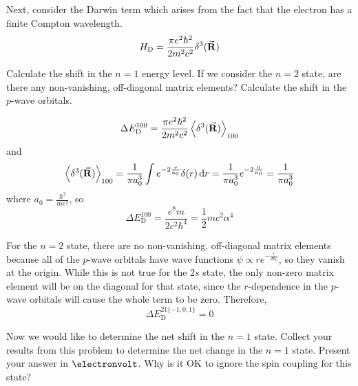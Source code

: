 \documentclass[a4paper,twoside]{article}
\begin{document}
Next, consider the Darwin term which arises from the fact that the electron has a finite Compton wavelength.
\begin{equation}
    H_{\text{D}} = \frac{\pi e^2 \hbar^2}{2m^2 c^2} \delta^3(\va{R})
\end{equation}

Calculate the shift in the $ n = 1 $ energy level. If we consider the $ n = 2 $ state, are there any non-vanishing, off-diagonal matrix elements? Calculate the shift in the $ p $-wave orbitals.

\begin{problem}
    \begin{equation}
        \Delta E_{\text{D}}^{100} = \frac{\pi e^2 \hbar^2}{2m^2 c^2} \ev{\delta^3(\va{R})}_{100}
    \end{equation}
    and
    \begin{equation}
        \ev{\delta^3(\va{R})}_{100} = \frac{1}{\pi a_0^3} \int e^{-2 \frac{r}{a_0}} \delta(r) \dd{r} = \frac{1}{\pi a_0^3} e^{-2 \frac{0}{a_0}} = \frac{1}{\pi a_0^3}
    \end{equation}
    where $ a_0 = \frac{\hbar^2}{m e^2} $, so
    \begin{equation}
        \Delta E_{\text{D}}^{100} = \frac{e^8 m}{2 c^2 \hbar^4} = \frac{1}{2} mc^2 \alpha^4
    \end{equation}

    For the $ n = 2 $ state, there are no non-vanishing, off-diagonal matrix elements because all of the $ p $-wave orbitals have wave functions $ \psi \propto r e^{- \frac{r}{2a_0}} $, so they vanish at the origin. While this is not true for the $ 2s $ state, the only non-zero matrix element will be on the diagonal for that state, since the $ r $-dependence in the $ p $-wave orbitals will cause the whole term to be zero. Therefore,
    \begin{equation}
        \Delta E_{\text{D}}^{21\{-1,0,1\}} = 0
    \end{equation}
\end{problem}

Now we would like to determine the net shift in the $ n = 1 $ state. Collect your results from this problem to determine the net change in the $ n = 1 $ state. Present your answer in $ \electronvolt $. Why is it OK to ignore the spin coupling for this state?
\end{document}
